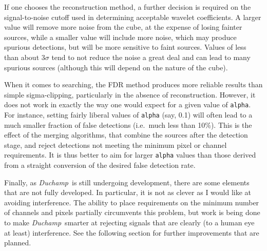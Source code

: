 \documentclass[12pt,a4paper]{article}
\newcommand{\ie}{i.e.\ }
\newcommand{\duchamp}{\emph{Duchamp}}
\begin{document}
If one chooses the reconstruction method, a further decision is
required on the signal-to-noise cutoff used in determining acceptable
wavelet coefficients. A larger value will remove more noise from the
cube, at the expense of losing fainter sources, while a smaller value
will include more noise, which may produce spurious detections, but
will be more sensitive to faint sources. Values of less than about
$3\sigma$ tend to not reduce the noise a great deal and can lead to
many spurious sources (although this will depend on the nature of the
cube).

When it comes to searching, the FDR method produces more reliable results 
than simple sigma-clipping, particularly in the absence of reconstruction. 
However, it does not work in exactly the way one would expect for a 
given value of \texttt{alpha}. For instance, setting fairly liberal values 
of \texttt{alpha} (say, 0.1) will often lead to a much smaller fraction 
of false detections (\ie much less than 10\%). This is the effect of the 
merging algorithms, that combine the sources after the detection stage,  
and reject detections not meeting the minimum pixel or channel requirements. 
It is thus better to aim for larger \texttt{alpha} values than those derived
from a straight conversion of the desired false detection rate.

Finally, as \duchamp\ is still undergoing development, there are some
elements that are not fully developed. In particular, it is not as
clever as I would like at avoiding interference. The ability to place
requirements on the minimum number of channels and pixels partially
circumvents this problem, but work is being done to make \duchamp\
smarter at rejecting signals that are clearly (to a human eye at
least) interference. See the following section for further
improvements that are planned.
\end{document}
